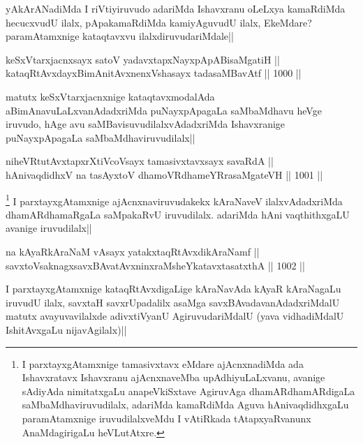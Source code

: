 \begin{artha}
yAkArANadiMda I riVtiyiruvudo adariMda Ishavxranu oLeLxya kamaRdiMda hecucxvudU ilalx, pApakamaRdiMda kamiyAguvudU ilalx, EkeMdare? paramAtamxnige kataqtavxvu ilalxdiruvudariMdale||
\end{artha}

\begin{shl}
keSxVtarxjacnxsayx satoV yadavxtapxNayxpApABisaMgatiH || \\
kataqRtAvxdayxBimAnitAvxnenxVshasayx tadasaMBavAtf ||  1000 ||  
\end{shl}

\begin{artha}
matutx keSxVtarxjacnxnige kataqtavxmodalAda aBimAnavuLaLxvanAdadxriMda puNayxpApagaLa saMbaMdhavu heVge iruvudo, hAge avu saMBavisuvudilalxvAdadxriMda Ishavxranige puNayxpApagaLa saMbaMdhaviruvudilalx||
\end{artha}

\begin{shl}
niheVRtutAvxtapxrXtiVcoV\s sayx tamasivxtavxsayx savaRdA || \\
hAnivaqdidhxV na tasAyxtoV dhamoVRdhameYRrasaMgateVH ||  1001 ||  
\end{shl}

\begin{artha}
\footnote{I parxtayxgAtamxnige tamasivxtavx eMdare ajAcnxnadiMda ada Ishavxratavx Ishavxranu ajAcnxnaveMba upAdhiyuLaLxvanu, avanige sAdiyAda nimitatxgaLu anapeVkiSxtave AgiruvAga dhamARdhamARdigaLa saMbaMdhaviruvudilalx, adariMda kamaRdiMda Aguva hAnivaqdidhxgaLu paramAtamxnige iruvudilalxveMdu I vAtiRkada tAtapxyaRvanunx AnaMdagirigaLu heVLutAtxre.} I parxtayxgAtamxnige ajAcnxnaviruvudakekx kAraNaveV ilalxvAdadxriMda dhamARdhamaRgaLa saMpakaRvU iruvudilalx. adariMda hAni vaqthithxgaLU avanige iruvudilalx||
\end{artha}


\begin{shl}
na kAyaRkAraNaM vA\s sayx yatakxtaqRtAvxdikAraNamf || \\
savxtoV\s saknagxsavxBAvatAvxninxraMsheYkatavxtasatxthA ||  1002 ||  
\end{shl}

\begin{artha}
I parxtayxgAtamxnige kataqRtAvxdigaLige kAraNavAda kAyaR kAraNagaLu iruvudU ilalx, savxtaH savxrUpadalilx asaMga savxBAvadavanAdadxriMdalU matutx avayuvavilalxde adivxtiVyanU AgiruvudariMdalU (yava vidhadiMdalU IshitAvxgaLu nijavAgilalx)||
\end{artha}

